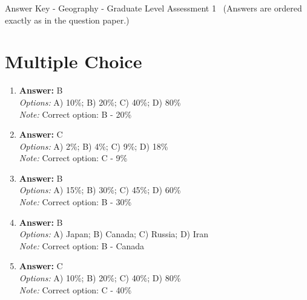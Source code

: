 \documentclass[12pt]{article}
\begin{document}
\begin{center}
Answer Key - Geography - Graduate Level Assessment 1 \
\small (Answers are ordered exactly as in the question paper.)
\end{center}

\section*{Multiple Choice}
\begin{enumerate}[label=\arabic*.]
\item \textbf{Answer:} B
\\ \textit{Options:} A) 10\%; B) 20\%; C) 40\%; D) 80\%
\\ \textit{Note:} Correct option: B - 20\%
\item \textbf{Answer:} C
\\ \textit{Options:} A) 2\%; B) 4\%; C) 9\%; D) 18\%
\\ \textit{Note:} Correct option: C - 9\%
\item \textbf{Answer:} B
\\ \textit{Options:} A) 15\%; B) 30\%; C) 45\%; D) 60\%
\\ \textit{Note:} Correct option: B - 30\%
\item \textbf{Answer:} B
\\ \textit{Options:} A) Japan; B) Canada; C) Russia; D) Iran
\\ \textit{Note:} Correct option: B - Canada
\item \textbf{Answer:} C
\\ \textit{Options:} A) 10\%; B) 20\%; C) 40\%; D) 80\%
\\ \textit{Note:} Correct option: C - 40\%
\end{enumerate}
\end{document}
